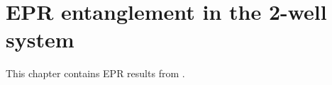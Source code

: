 \chapter{EPR entanglement in the 2-well system}

This chapter contains EPR results from \cite{Opanchuk2012a}.
